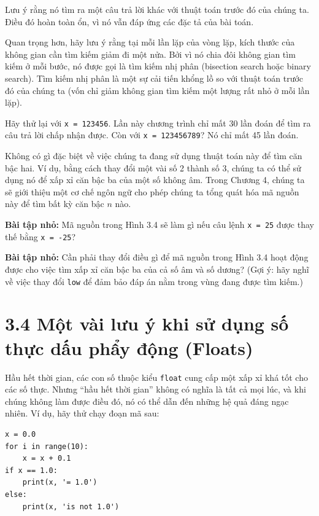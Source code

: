 Lưu ý rằng nó tìm ra một câu trả lời khác với thuật toán trước đó của chúng ta. Điều đó hoàn toàn ổn, vì nó vẫn đáp ứng các đặc tả của bài toán.

Quan trọng hơn, hãy lưu ý rằng tại mỗi lần lặp của vòng lặp, kích thước của không gian cần tìm kiếm giảm đi một nửa. Bởi vì nó chia đôi không gian tìm kiếm ở mỗi bước, nó được gọi là tìm kiếm nhị phân (bisection search hoặc binary search). Tìm kiếm nhị phân là một sự cải tiến khổng lồ so với thuật toán trước đó của chúng ta (vốn chỉ giảm không gian tìm kiếm một lượng rất nhỏ ở mỗi lần lặp).

Hãy thử lại với \texttt{x = 123456}. Lần này chương trình chỉ mất 30 lần đoán để tìm ra câu trả lời chấp nhận được. Còn với \texttt{x = 123456789}? Nó chỉ mất 45 lần đoán.

Không có gì đặc biệt về việc chúng ta đang sử dụng thuật toán này để tìm căn bậc hai. Ví dụ, bằng cách thay đổi một vài số 2 thành số 3, chúng ta có thể sử dụng nó để xấp xỉ căn bậc ba của một số không âm. Trong Chương 4, chúng ta sẽ giới thiệu một cơ chế ngôn ngữ cho phép chúng ta tổng quát hóa mã nguồn này để tìm bất kỳ căn bậc $n$ nào.

\noindent \textbf{Bài tập nhỏ:} Mã nguồn trong Hình 3.4 sẽ làm gì nếu câu lệnh \texttt{x = 25} được thay thế bằng \texttt{x = -25}?

\noindent \textbf{Bài tập nhỏ:} Cần phải thay đổi điều gì để mã nguồn trong Hình 3.4 hoạt động được cho việc tìm xấp xỉ căn bậc ba của cả số âm và số dương? (Gợi ý: hãy nghĩ về việc thay đổi \texttt{low} để đảm bảo đáp án nằm trong vùng đang được tìm kiếm.)

\section*{3.4 Một vài lưu ý khi sử dụng số thực dấu phẩy động (Floats)}

\noindent \indent Hầu hết thời gian, các con số thuộc kiểu \texttt{float} cung cấp một xấp xỉ khá tốt cho các số thực. Nhưng ``hầu hết thời gian'' không có nghĩa là tất cả mọi lúc, và khi chúng không làm được điều đó, nó có thể dẫn đến những hệ quả đáng ngạc nhiên. Ví dụ, hãy thử chạy đoạn mã sau:

\begin{verbatim}
x = 0.0 
for i in range(10): 
    x = x + 0.1 
if x == 1.0: 
    print(x, '= 1.0') 
else: 
    print(x, 'is not 1.0')
\end{verbatim}

